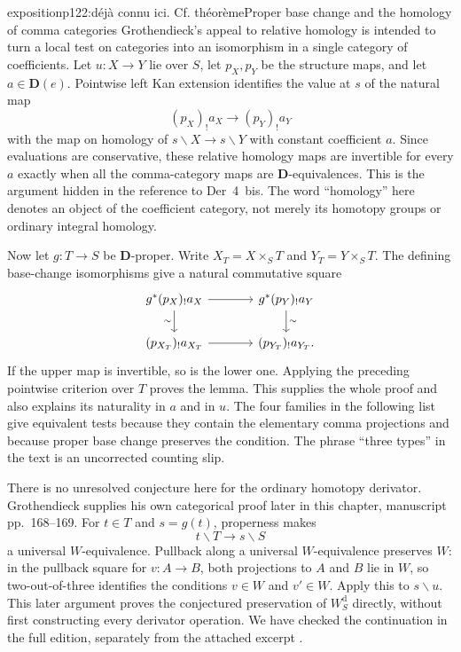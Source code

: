\begin{dcomment}{exposition}{p122:déjà connu ici. Cf. théorème}{Proper base change and the homology of comma categories}
Grothendieck's appeal to relative homology is intended to turn a local test on categories into an isomorphism in a single category of coefficients. Let $u:X\to Y$ lie over $S$, let $p_X,p_Y$ be the structure maps, and let $a\in\mathbf D(e)$. Pointwise left Kan extension identifies the value at $s$ of the natural map
\[
 (p_X)_!a_X\longrightarrow(p_Y)_!a_Y
\]
with the map on homology of $s\backslash X\to s\backslash Y$ with constant coefficient $a$. Since evaluations are conservative, these relative homology maps are invertible for every $a$ exactly when all the comma-category maps are $\mathbf D$-equivalences. This is the argument hidden in the reference to Der~4~bis. The word ``homology'' here denotes an object of the coefficient category, not merely its homotopy groups or ordinary integral homology.

Now let $g:T\to S$ be $\mathbf D$-proper. Write $X_T=X\times_ST$ and $Y_T=Y\times_ST$. The defining base-change isomorphisms give a natural commutative square
\[
\begin{tikzcd}[column sep=large]
g^*(p_X)_!a_X\arrow[r]\arrow[d,"\sim"']&g^*(p_Y)_!a_Y\arrow[d,"\sim"]\\
(p_{X_T})_!a_{X_T}\arrow[r]&(p_{Y_T})_!a_{Y_T}.
\end{tikzcd}
\]
If the upper map is invertible, so is the lower one. Applying the preceding pointwise criterion over $T$ proves the lemma. This supplies the whole proof and also explains its naturality in $a$ and in $u$. The four families in the following list give equivalent tests because they contain the elementary comma projections and because proper base change preserves the condition. The phrase ``three types'' in the text is an uncorrected counting slip.

There is no unresolved conjecture here for the ordinary homotopy derivator. Grothendieck supplies his own categorical proof later in this chapter, manuscript pp.~168--169. For $t\in T$ and $s=g(t)$, properness makes
\[
 t\backslash T\longrightarrow s\backslash S
\]
a universal $W$-equivalence. Pullback along a universal $W$-equivalence preserves $W$: in the pullback square for $v:A\to B$, both projections to $A$ and $B$ lie in $W$, so two-out-of-three identifies the conditions $v\in W$ and $v'\in W$. Apply this to $s\backslash u$. This later argument proves the conjectured preservation of $W_S^{\mathrm d}$ directly, without first constructing every derivator operation. We have checked the continuation in the full edition, separately from the attached excerpt \citep[VI, ms.~pp.~168--169]{Grothendieck1990VI}.


\end{dcomment}
